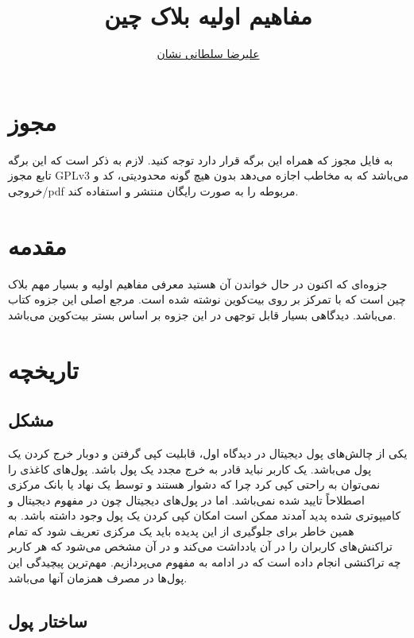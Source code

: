 \documentclass[10pt, a4paper]{article}
\title{مفاهیم اولیه بلاک چین}
\author{\href{mailto:a.soltani@iau-tnb.ac.ir}{علیرضا سلطانی نشان}}
\begin{document}
\maketitle
\tableofcontents

\section{مجوز}

به فایل مجوز که همراه این برگه قرار دارد توجه کنید. لازم به ذکر است که این برگه
تابع مجوز GPLv3 می‌باشد که به مخاطب اجازه می‌دهد بدون هیچ گونه محدودیتی، کد و
خروجی/pdf مربوطه را به صورت رایگان منتشر و استفاده کند.

\section{مقدمه}

جزوه‌ای که اکنون در حال خواندن آن هستید معرفی مفاهیم اولیه و بسیار مهم بلاک چین
است که با تمرکز بر روی بیت‌کوین نوشته شده است. مرجع اصلی این جزوه کتاب
 می‌باشد. دیدگاهی بسیار قابل توجهی
در این جزوه بر اساس بستر بیت‌کوین می‌باشد.

\section{تاریخچه}

\subsection{مشکل }

یکی از چالش‌های پول دیجیتال در دیدگاه اول، قابلیت کپی گرفتن و دوبار خرج کردن یک
پول می‌باشد. یک کاربر نباید قادر به خرج مجدد یک پول باشد. پول‌های کاغذی را
نمی‌توان به راحتی کپی کرد چرا که دشوار هستند و توسط یک نهاد یا بانک مرکزی
اصطلاحاً تایید شده نمی‌باشد. اما در پول‌های دیجیتال چون در مفهوم دیجیتال و
کامیپوتری شده پدید آمدند ممکن است امکان کپی کردن یک پول وجود داشته باشد. به همین
خاطر برای جلوگیری از این پدیده باید یک مرکزی تعریف شود که تمام تراکنش‌های
کاربران را در آن یادداشت می‌کند و در آن مشخص می‌شود که هر کاربر چه تراکنشی انجام داده است که در ادامه به مفهوم  می‌پردازیم. مهم‌ترین پیچیدگی این
پول‌ها در مصرف همزمان آنها می‌باشد.

\subsection{ساختار پول}
\end{document}
